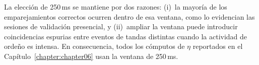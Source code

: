 La elección de 250\,ms se mantiene por dos razones: (i)~la mayoría de los
emparejamientos correctos ocurren dentro de esa ventana, como lo evidencian las
sesiones de validación presencial, y (ii)~ampliar la ventana puede introducir
coincidencias espurias entre eventos de tandas distintas cuando la actividad de
ordeño es intensa. En consecuencia, todos los cómputos de $\eta$ reportados en
el Capítulo~\ref{chapter:chapter06} usan la ventana de 250\,ms.

